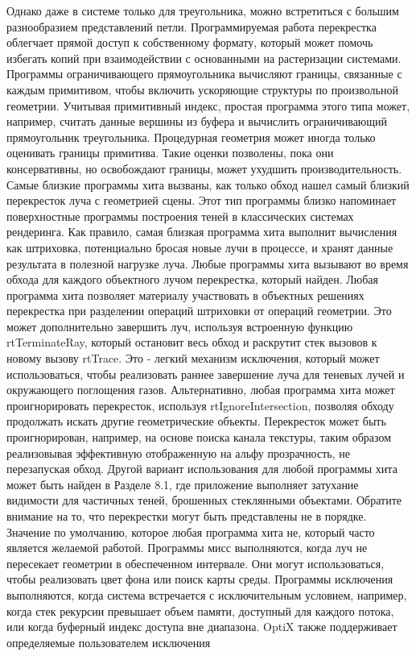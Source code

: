 Однако даже в системе только для треугольника, можно встретиться с большим разнообразием представлений петли. Программируемая работа перекрестка облегчает прямой доступ к собственному формату, который может помочь избегать копий при взаимодействии с основанными на растеризации системами. Программы ограничивающего прямоугольника вычисляют границы, связанные с каждым примитивом, чтобы включить ускоряющие структуры по произвольной геометрии. Учитывая примитивный индекс, простая программа этого типа может, например, считать данные вершины из буфера и вычислить ограничивающий прямоугольник треугольника. Процедурная геометрия может иногда только оценивать границы примитива. Такие оценки позволены, пока они консервативны, но освобождают границы, может ухудшить производительность. Самые близкие программы хита вызваны, как только обход нашел самый близкий перекресток луча с геометрией сцены. Этот тип программы близко напоминает поверхностные программы построения теней в классических системах рендеринга. Как правило, самая близкая программа хита выполнит вычисления
как штриховка, потенциально бросая новые лучи в процессе, и хранят данные результата в полезной нагрузке луча. Любые программы хита вызывают во время обхода для каждого объектного лучом перекрестка, который найден. Любая программа хита позволяет материалу участвовать в объектных решениях перекрестка при разделении операций штриховки от операций геометрии.
Это может дополнительно завершить луч, используя встроенную функцию rtTerminateRay, который остановит весь обход и раскрутит стек вызовов к новому вызову rtTrace. Это - легкий механизм исключения, который может использоваться, чтобы реализовать раннее завершение луча для теневых лучей и окружающего поглощения газов. Альтернативно, любая программа хита может проигнорировать перекресток, используя rtIgnoreIntersection, позволяя обходу продолжать искать другие геометрические объекты. Перекресток может быть проигнорирован, например, на основе поиска канала текстуры, таким образом реализовывая эффективную отображенную на альфу прозрачность, не перезапуская обход. Другой вариант использования для любой программы хита может быть найден в Разделе 8.1, где приложение выполняет затухание видимости для частичных теней, брошенных стеклянными объектами. Обратите внимание на то, что перекрестки могут быть представлены не в порядке. Значение по умолчанию, которое любая программа хита не, который часто является желаемой работой. Программы мисс выполняются, когда луч не пересекает геометрии в обеспеченном интервале. Они могут использоваться, чтобы реализовать цвет фона или поиск карты среды. Программы исключения выполняются, когда система встречается с исключительным условием, например, когда стек рекурсии превышает объем памяти, доступный для каждого потока, или когда буферный индекс доступа вне диапазона. OptiX также поддерживает определяемые пользователем исключения
